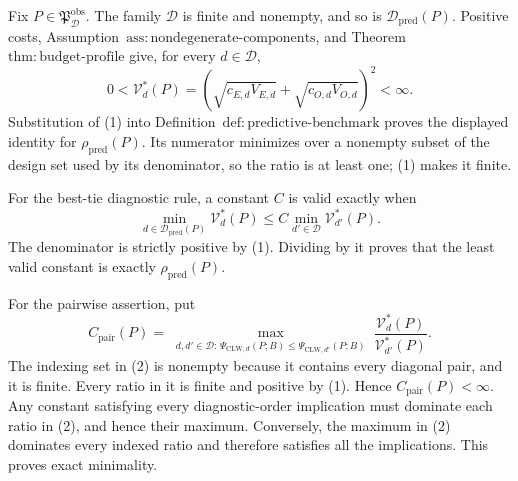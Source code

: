 Fix \(P\in\mathfrak P_{\mathcal D}^{\mathrm{obs}}\).  The family \(\mathcal D\) is finite and nonempty, and so is \(\mathcal D_{\mathrm{pred}}(P)\).  Positive costs, Assumption~\(\mathrm{ass{:}nondegenerate\text{-}components}\), and Theorem~\(\mathrm{thm{:}budget\text{-}profile}\) give, for every \(d\in\mathcal D\),
\[
 0<\mathcal V_d^*(P)
 =\left(\sqrt{c_{E,d}V_{E,d}}+
          \sqrt{c_{O,d}V_{O,d}}\right)^2<\infty.       \tag{1}
\]
Substitution of (1) into Definition~\(\mathrm{def{:}predictive\text{-}benchmark}\) proves the displayed identity for \(\rho_{\mathrm{pred}}(P)\).  Its numerator minimizes over a nonempty subset of the design set used by its denominator, so the ratio is at least one; (1) makes it finite.

For the best-tie diagnostic rule, a constant \(C\) is valid exactly when
\[
 \min_{d\in\mathcal D_{\mathrm{pred}}(P)}\mathcal V_d^*(P)
 \le C\min_{d'\in\mathcal D}\mathcal V_{d'}^*(P).
\]
The denominator is strictly positive by (1).  Dividing by it proves that the least valid constant is exactly \(\rho_{\mathrm{pred}}(P)\).

For the pairwise assertion, put
\[
 C_{\mathrm{pair}}(P)=
 \max_{\substack{d,d'\in\mathcal D:\,
 \Psi_{\mathrm{CLW},d}(P;B)\le
 \Psi_{\mathrm{CLW},d'}(P;B)}}
 \frac{\mathcal V_d^*(P)}{\mathcal V_{d'}^*(P)}.        \tag{2}
\]
The indexing set in (2) is nonempty because it contains every diagonal pair, and it is finite.  Every ratio in it is finite and positive by (1).  Hence \(C_{\mathrm{pair}}(P)<\infty\).  Any constant satisfying every diagnostic-order implication must dominate each ratio in (2), and hence their maximum.  Conversely, the maximum in (2) dominates every indexed ratio and therefore satisfies all the implications.  This proves exact minimality.

